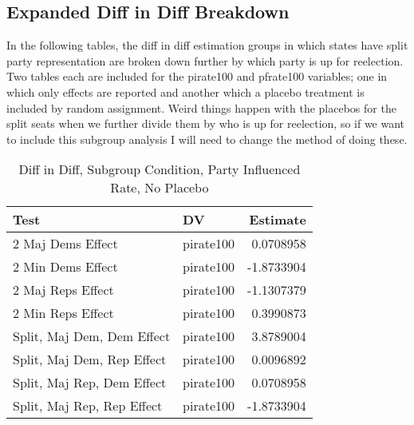 \documentclass[12pt]{article}
\begin{document}
\subsection{Expanded Diff in Diff Breakdown}

In the following tables, the diff in diff estimation groups in which states have split party representation are broken down further by which party is up for reelection. Two tables each are included for the pirate100 and pfrate100 variables; one in which only effects are reported and another which a placebo treatment is included by random assignment. Weird things happen with the placebos for the split seats when we further divide them by who is up for reelection, so if we want to include this subgroup analysis I will need to change the method of doing these.

\begin{table}[H]
	\centering
	\caption{Diff in Diff, Subgroup Condition, Party Influenced Rate, No Placebo}
	\begin{tabular}{llr}
		\hline
		Test & DV & Estimate \\ 
		\hline
		2 Maj Dems Effect & pirate100 & 0.0708958 \\  
		2 Min Dems Effect & pirate100 & -1.8733904 \\  
		\hline
		2 Maj Reps Effect & pirate100 & -1.1307379 \\ 
		2 Min Reps Effect & pirate100 & 0.3990873 \\ 
		\hline
		Split, Maj Dem, Dem Effect & pirate100 & 3.8789004 \\ 
		Split, Maj Dem, Rep Effect & pirate100 & 0.0096892 \\  
		\hline
		Split, Maj Rep, Dem Effect & pirate100 & 0.0708958 \\ 
		Split, Maj Rep, Rep Effect & pirate100 & -1.8733904 \\ 
		\hline
	\end{tabular}
\end{table}
\end{document}
